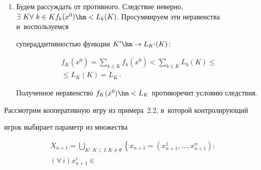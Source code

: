 \begin{multicols}{2}
\begin{enumerate}[1.]
\begin{multline*}
    \eqdelta{}\\

    {}\eqdelta

\min\limits_{k\in K} f_k(x^0)\leq f_{k_0}(x^0)\,.

    \end{multline*}

Достаточность доказана. По определению~3.2 исход игры~$x^0$ удовлетворяет

условию $(\forall\ K)\exists\ k_0\hm\in K f_{k_0}(x^0)\hm\geq L_{k_0}(K)$. Снова

воспользуемся следствием~3.1:

$$

f_{k_0}(x^0) \geq L_{k_0}(K)\geq \min\limits_{k\in K} L_k(K) \geq L_K\,.

$$

Необходимое условие доказано.

\item Будем рассуждать от противного. Следствие неверно, $\exists\ K \forall\ k\in K

f_k(x^0)\hm< L_k(K)$. Просуммируем эти неравенства и~воспользуемся

супераддитивностью функции $K^\prime\hm\to L_{K^\prime}(K)$:

\begin{multline*}

f_K(x^0) =\sum\limits_{k\in K} f_k(x^0) < \sum\limits_{k\in K} L_k(K) \leq{}\\

{}\leq

L_K(K)=L_K\,.

\end{multline*}

Полученное неравенство $f_K(x^0)\hm< L_K$ противоречит условию следствия.

\end{enumerate}



    Рассмотрим кооперативную игру из примера~2.2, в~которой контролирующий

игрок выбирает параметр из множества

   \begin{multline*}

    X_{n+1} =\mathop{\bigcup}\limits_{K:\ K\subset I, K\not= \emptyset} \left\{

    x_{n+1}=\left( x^1_{n+1},\ldots, x^n_{n+1}\right):\right.\\

    \left. (\forall\ i) x^i_{n+1} \in


\end{multline*}
\end{multicols}

